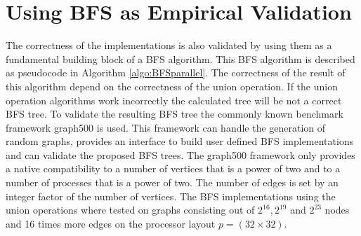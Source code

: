 \section{Using BFS as Empirical Validation} \label{sec:validationBFS}
The correctness of the implementations is also validated by using them as a fundamental building block of a BFS algorithm. This BFS algorithm is described as pseudocode in Algorithm \ref{algo:BFSparallel}. The correctness of the result of this algorithm depend on the correctness of the union operation. If the union operation algorithms work incorrectly the calculated tree will be not a correct BFS tree. To validate the resulting BFS tree the commonly known benchmark framework graph500 \cite{graph500} is used. This framework can handle the generation of random graphs, provides an interface to build user defined BFS implementations and can validate the proposed BFS trees. The graph500 framework only provides a native compatibility to a number of vertices that is a power of two and to a number of processes that is a power of two. The number of edges is set by an integer factor of the number of vertices. The BFS implementations using the union operations where tested on graphs consisting out of $2^{16}, 2^{19}$ and $2^{23}$ nodes and 16 times more edges on the processor layout $p=(32\times 32)$.















